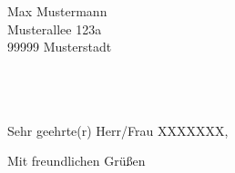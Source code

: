 \documentclass[a4paper,11pt]{scrartcl}
\begin{document}
    \begin{letter}{Max Mustermann\\
                   Musterallee 123a\\
                   99999 Musterstadt\\
                   ~\\
                   ~\\
                   ~\\}
        \opening{Sehr geehrte(r) Herr/Frau XXXXXXX,}

        \lipsum[1-10]

        \closing{Mit freundlichen Gr\"u{\ss}en}
    \end{letter}
\end{document}
